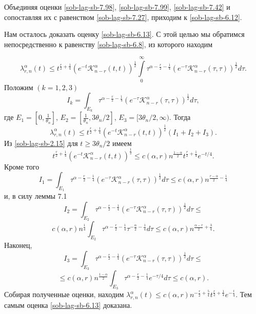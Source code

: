 Объединяя оценки \eqref{sob-lag-sb-7.98},  \eqref{sob-lag-sb-7.99}, \eqref{sob-lag-sb-7.42} и  сопоставляя их с равенством \eqref{sob-lag-sb-7.27}, приходим к \eqref{sob-lag-sb-6.12}.

Нам осталось  доказать  оценку \eqref{sob-lag-sb-6.13}. С этой целью мы обратимся непосредственно к равенству \eqref{sob-lag-sb-6.8}, из которого находим

  $$
\lambda_{r,n}^\alpha(t)\le t^{\frac r2+\frac14}(e^{-t}\mathcal{K}_{n-r}^\alpha(t,t))^{\frac12}\int\limits_0^\infty \tau^{\alpha-\frac r2-\frac14}(e^{-\tau}\mathcal{K}_{n-r}^\alpha(\tau,\tau))^\frac12d\tau.
$$
Положим $(k=1,2,3)$
$$
I_k=\int_{E_k}\tau^{\alpha-\frac r2-\frac14}(e^{-\tau}\mathcal{K}_{n-r}^\alpha(\tau,\tau))^\frac12d\tau,
$$
где $E_1=[0,\frac1{\theta_n}]$, $E_2=[\frac1{\theta_n},3\theta_n/2]$, $E_3=[3\theta_n/2,\infty)$. Тогда
$$
\lambda_{r,n}^\alpha(t)\le t^{\frac r2+\frac14}(e^{-t}\mathcal{K}_{n-r}^\alpha(t,t))^{\frac12}(I_1+I_2+I_3).
$$
Из \eqref{sob-lag-sb-2.15} для $t\ge 3\theta_n/2$   имеем
$$
t^{\frac r2+\frac14}(e^{-t}\mathcal{K}_{n-r}^\alpha(t,t))^{\frac12}\le c(\alpha,r)n^\frac{1-\alpha}{2}t^{\frac r2+\frac14}e^{-t/4}.
$$
Кроме того
$$
I_1=\int_{E_1}\tau^{\alpha-\frac r2-\frac14}(e^{-\tau}\mathcal{K}_{n-r}^\alpha(\tau,\tau))^\frac12d\tau\le c(\alpha,r)n^{\frac{r-\alpha}{2}-\frac14}
$$
и, в силу леммы 7.1
$$
I_2=\int_{E_2}\tau^{\alpha-\frac r2-\frac14}(e^{-\tau}\mathcal{K}_{n-r}^\alpha(\tau,\tau))^\frac12d\tau\le
$$
$$
c(\alpha,r)n^\frac14\int_{E_2}\tau^{\alpha-\frac r2-\frac14}\tau^{-\frac{\alpha}{2}-\frac14}d\tau
\le c(\alpha,r)n^{\frac{\alpha-r}{2}+\frac34}.
$$
Наконец,
$$
I_3=\int_{E_3}\tau^{\alpha-\frac r2-\frac14}(e^{-\tau}\mathcal{K}_{n-r}^\alpha(\tau,\tau))^\frac12d\tau\le
$$
$$
\le c(\alpha,r)n^\frac{1-\alpha}{2}\int_{E_3}\tau^{\alpha-\frac r2-\frac14}e^{-\tau/4}d\tau \le c(\alpha,r).
$$
Собирая полученные оценки, находим
$
\lambda_{r,n}^\alpha(t)\le c(\alpha,r)n^{-\frac{r}{2}+\frac54}t^{\frac r2+\frac14}e^{-\frac{t}{4}}.
$
Тем самым оценка \eqref{sob-lag-sb-6.13} доказана.